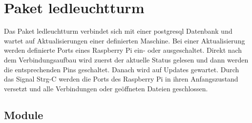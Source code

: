 %
%
%


\section{Paket ledleuchtturm}

    \label{ledleuchtturm}
Das Paket ledleuchtturm verbindet sich mit einer postgresql Datenbank und 
wartet auf Aktualisierungen einer definierten Maschine. Bei einer 
Aktualisierung werden definierte Ports eines Raspberry Pi ein- oder 
ausgeschaltet. Direkt nach dem Verbindungsaufbau wird zuerst der aktuelle 
Status gelesen und dann werden die entsprechenden Pins geschaltet. Danach 
wird auf Updates gewartet. Durch das Signal Strg-C werden die Ports des 
Raspberry Pi in ihren Anfangszustand versetzt und alle Verbindungen oder 
geöffneten Dateien geschlossen.



\subsection{Module}

